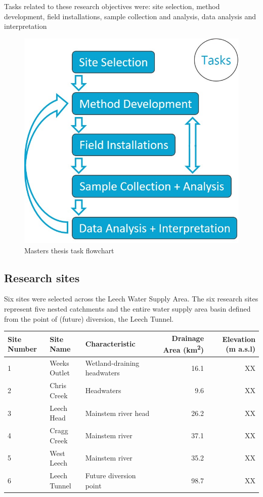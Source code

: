\documentclass[]{article}
\begin{document}
Tasks related to these research objectives were: site selection, method
development, field installations, sample collection and analysis, data
analysis and interpretation

\begin{figure}
\centering
\includegraphics{images/MSc_tasksflowchart.jpg}
\caption{Masters thesis task flowchart}
\end{figure}

\subsection{Research sites}\label{research-sites}

Six sites were selected across the Leech Water Supply Area. The six
research sites represent five nested catchments and the entire water
supply area basin defined from the point of (future) diversion, the
Leech Tunnel.

\begin{longtable}[]{@{}lllrr@{}}
\toprule
Site Number & Site Name & Characteristic & Drainage Area
(km\textsuperscript{2}) & Elevation (m a.s.l)\tabularnewline
\midrule
\endhead
1 & Weeks Outlet & Wetland-draining headwaters & 16.1 &
XX\tabularnewline
2 & Chris Creek & Headwaters & 9.6 & XX\tabularnewline
3 & Leech Head & Mainstem river head & 26.2 & XX\tabularnewline
4 & Cragg Creek & Mainstem river & 37.1 & XX\tabularnewline
5 & West Leech & Mainstem river & 35.2 & XX\tabularnewline
6 & Leech Tunnel & Future diversion point & 98.7 & XX\tabularnewline
\bottomrule
\end{longtable}
\end{document}
